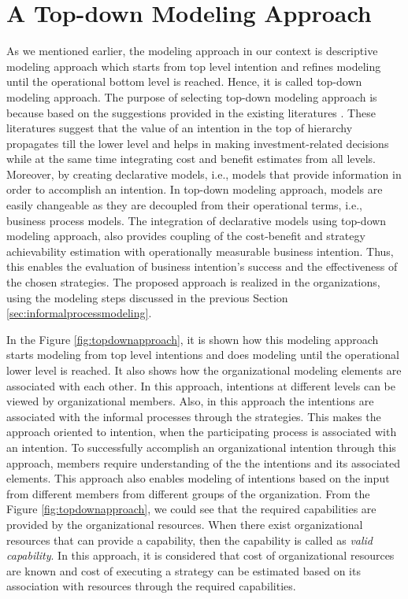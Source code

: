 \section{A Top-down Modeling Approach}
\label{sec:topdownapproach}
As we mentioned earlier, the modeling approach in our context is descriptive modeling approach which starts from top level intention and refines modeling until the operational bottom level is reached. Hence, it is called top-down modeling approach. The purpose of selecting top-down modeling approach is because based on the suggestions provided in the existing literatures \cite{Mandic2010, Bider2005,Sungur2016}. These literatures suggest that the value of an intention in the top of hierarchy propagates till the lower level and helps in making investment-related decisions while at the same time integrating cost and benefit estimates from all levels. Moreover, by creating declarative models, i.e., models that provide information in order to accomplish an intention. In top-down modeling approach, models are easily changeable as they are decoupled from their operational terms, i.e., business process models. The integration of declarative models using top-down modeling approach, also provides coupling of the cost-benefit and strategy achievability estimation with operationally measurable business intention. Thus, this enables the evaluation of business intention's success and the effectiveness of the chosen strategies. The proposed approach is realized in the organizations, using the modeling steps discussed in the previous Section \ref{sec:informalprocessmodeling}. 

In the Figure \ref{fig:topdownapproach}, it is shown how this modeling approach starts modeling from top level intentions and does modeling until the operational lower level is reached. It also shows how the organizational modeling elements are associated with each other. In this approach, intentions at different levels can be viewed by organizational members. Also, in this approach the intentions are associated with the informal processes through the strategies. This makes the approach oriented to intention, when the participating process is associated with an intention. To successfully accomplish an organizational intention through this approach, members require understanding of the the intentions and its associated elements. This approach also enables modeling of intentions based on the input from different members from different groups of the organization. From the Figure \ref{fig:topdownapproach}, we could see that the required capabilities are provided by the organizational resources. When there exist organizational resources that can provide a capability, then the capability is called as \textit{valid capability}. In this approach, it is considered that cost of organizational resources are known and cost of executing a strategy can be estimated based on its association with resources through the required capabilities. 



